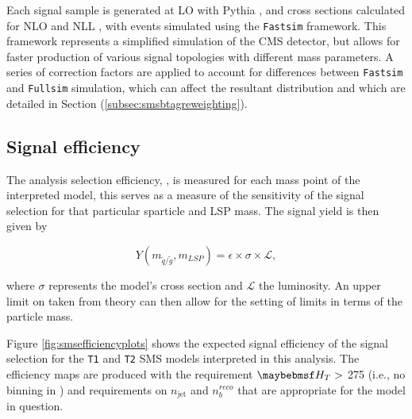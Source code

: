 Each signal sample is generated at \acf{LO} with Pythia \cite{Sjostrand:2006za}, and cross sections calculated for \acf{NLO} and \acf{NLL} \cite{Beenakker:1996ch}, with events simulated using the \texttt{Fastsim} framework. This framework represents a simplified simulation of the \ac{CMS} detector, but allows for faster production of various signal topologies with different mass parameters. A series of correction factors are applied to account for differences between \texttt{Fastsim} \cite{1742-6596-331-3-032049} and \texttt{Fullsim} \cite{1742-6596-331-3-032015} simulation, which can affect the resultant \nbreco distribution and which are detailed in Section (\ref{subsec:smsbtagreweighting}). 

\subsection{Signal efficiency}

The analysis selection efficiency, \epsilon, is measured for each mass point of the interpreted model, this serves as a measure of the sensitivity of the signal selection for that particular sparticle and \ac{LSP} mass. The signal yield is then given by

\begin{equation}
Y(m_{\widetilde{q}/\widetilde{g}},m_{LSP}) = \epsilon \times \sigma \times \mathcal{L},
\end{equation}

where $\sigma$ represents the model's cross section and $\mathcal{L}$ the luminosity. An upper limit on \sigma taken from theory can then allow for the setting of limits in terms of the particle mass. 

Figure \ref{fig:smsefficiencyplots} shows the expected signal efficiency of the signal selection for the \texttt{T1} and \texttt{T2} \ac{SMS} models interpreted in this analysis. The efficiency maps are produced with the requirement $\theht >$ 275 \GeV (i.e., no binning in \theht) and requirements on $n_{\text{jet}}$ and $n_{b}^{reco}$ that are appropriate for the model in question.


